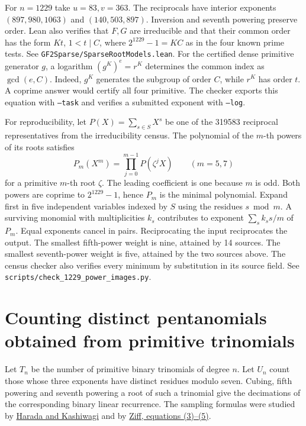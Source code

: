 \documentclass[11pt]{article}
\begin{document}
For \(n=1229\) take \(u=83,v=363\). The reciprocals have interior
exponents \((897,980,1063)\) and \((140,503,897)\). Inversion and
seventh powering preserve order. Lean also verifies that \(F,G\) are
irreducible and that their common order has the form \(Kt\), \(1<t\mid C\),
where \(2^{1229}-1=KC\) as in the four known prime tests.
See \nolinkurl{GF2Sparse/SparseRootModels.lean}.
For the certified dense primitive generator \(g\), a logarithm
\((g^K)^e=r^K\) determines the common index as \(\gcd(e,C)\).
Indeed, \(g^K\) generates the subgroup of order \(C\), while
\(r^K\) has order \(t\). A coprime answer would certify
all four primitive. The checker exports this equation with
\texttt{--task} and verifies a submitted exponent with \texttt{--log}.

For reproducibility, let \(P(X)=\sum_{s\in S}X^s\) be one of the
319583 reciprocal representatives from the irreducibility census.
The polynomial of the \(m\)-th powers of its roots satisfies
\[
 P_m(X^m)=\prod_{j=0}^{m-1} P(\zeta^j X)
 \qquad (m=5,7)
\]
for a primitive \(m\)-th root \(\zeta\). The leading coefficient is one
because \(m\) is odd. Both powers are coprime to \(2^{1229}-1\), hence
\(P_m\) is the minimal polynomial. Expand first in five independent
variables indexed by \(S\) using the residues \(s\bmod m\). A surviving
monomial with multiplicities \(k_s\) contributes to exponent
\(\sum_s k_s s/m\) of \(P_m\). Equal exponents cancel in pairs.
Reciprocating the input reciprocates the output.
The smallest fifth-power weight is nine, attained by 14 sources.
The smallest seventh-power weight is five, attained by the two
sources above. The census checker also verifies every minimum by
substitution in its source field.
See \nolinkurl{scripts/check_1229_power_images.py}.

\section{Counting distinct pentanomials obtained from primitive trinomials}
\label{sec:trinomial-decimations}
Let \(T_n\) be the number of primitive binary trinomials of degree \(n\).
Let \(U_n\) count those whose three exponents have distinct residues
modulo seven. Cubing, fifth powering and seventh powering a root
of such a trinomial give the decimations of the corresponding binary
linear recurrence. The sampling formulas were studied by
\href{https://doi.org/10.9746/sicetr1965.21.875}{Harada and Kashiwagi}
and by \href{https://arxiv.org/pdf/cond-mat/9710104}{Ziff, equations (3)--(5)}.
\end{document}
